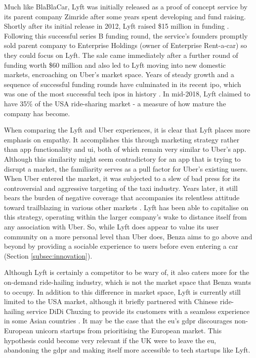 \documentclass{article}
\begin{document}
    Much like BlaBlaCar, Lyft was initially released as a proof of concept service by its parent company Zimride after some years spent developing and fund raising. Shortly after its initial release in 2012, Lyft raised \$15 million in funding \cite{lyftearlyseriesBfunding}. Following this successful series B funding round, the service's founders promptly sold parent company to Enterprise Holdings (owner of Enterprise Rent-a-car) so they could focus on Lyft. The sale came immediately after a further round of funding worth \$60 million and also led to Lyft moving into new domestic markets, encroaching on Uber's market space. Years of steady growth and a sequence of successful funding rounds have culminated in its recent \acrshort{ipo}, which was one of the most successful tech \acrshort{ipo}s in history \cite{lyftIPOtechcrunch}. In mid-2018, Lyft claimed to have 35\% of the USA ride-sharing market \cite{lyft35pcofmarketinUS} - a measure of how mature the company has become. \par
    
    When comparing the Lyft and Uber experiences, it is clear that Lyft places more emphasis on empathy. It accomplishes this through marketing strategy rather than app functionality \cite{lyftvalueofempathy} and \acrshort{ui}, both of which remain very similar to Uber's app. Although this similarity might seem contradictory for an app that is trying to disrupt a market, the familiarity serves as a pull factor for Uber's existing users. When Uber entered the market, it was subjected to a slew of bad press for its controversial and aggressive targeting of the taxi industry. Years later, it still bears the burden of negative coverage that accompanies its relentless attitude toward trailblazing in various other markets \cite{uberbadpressguardian}. Lyft has been able to capitalise on this strategy, operating within the larger company's wake to distance itself from any association with Uber. So, while Lyft does appear to value its user community on a more personal level than Uber does, Benza aims to go above and beyond by providing a sociable experience to users before even entering a car (Section \ref{subsec:innovation}). \par
    
    Although Lyft is certainly a competitor to be wary of, it also caters more for the on-demand ride-hailing industry, which is not the market space that Benza wants to occupy. In addition to this difference in market space, Lyft is currently still limited to the USA market, although it briefly partnered with Chinese ride-hailing service DiDi Chuxing to provide its customers with a seamless experience in some Asian countries \cite{lyftdidialliancemashable}. It may be the case that the \acrshort{eu}'s \acrshort{gdpr} discourages non-European \gls{unicorn} startups from prioritising the European market. This hypothesis could become very relevant if the UK were to leave the \acrshort{eu}, abandoning the \acrshort{gdpr} and making itself more accessible to tech startups like Lyft. \par
    
\end{document}

